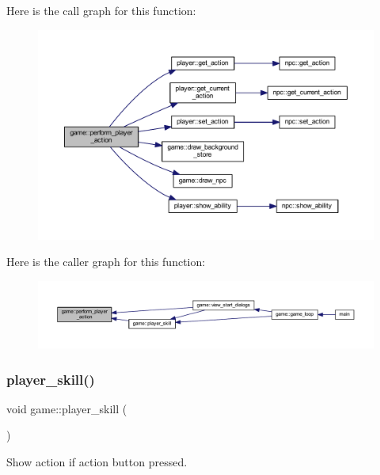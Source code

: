 Here is the call graph for this function\+:
\nopagebreak
\begin{figure}[H]
\begin{center}
\leavevmode
\includegraphics[width=350pt]{classgame_a50870549f1abdbc924743d8173ced15d_cgraph}
\end{center}
\end{figure}
Here is the caller graph for this function\+:
\nopagebreak
\begin{figure}[H]
\begin{center}
\leavevmode
\includegraphics[width=350pt]{classgame_a50870549f1abdbc924743d8173ced15d_icgraph}
\end{center}
\end{figure}
\mbox{\label{classgame_a478a3366ffd0e10713b0abc3adb65696}} 
\subsubsection{\texorpdfstring{player\+\_\+skill()}{player\_skill()}}
{\footnotesize\ttfamily void game\+::player\+\_\+skill (\begin{DoxyParamCaption}{ }\end{DoxyParamCaption})\hspace{0.3cm}{\ttfamily [private]}}



Show action if action button pressed. 

